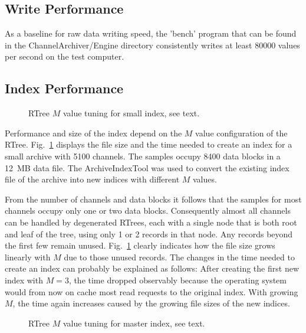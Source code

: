 \subsection{Write Performance}
As a baseline for raw data writing speed, the 'bench' program that can
be found in the ChannelArchiver/Engine directory consistently writes
at least 80000 values per second on the test computer.

\subsection{Index Performance}
\begin{figure}[htb]
\begin{center}
\end{center}
\caption{\label{fig:singleidxcompare}RTree $M$ value tuning for small index, see text.}
\end{figure}

Performance and size of the index depend on the $M$ value configuration of
the RTree. Fig.\ \ref{fig:singleidxcompare} displays the file size and
the time needed to create an index for a small archive with 5100
channels. The samples occupy 8400 data blocks in a 12~MB data file.
The ArchiveIndexTool was used to convert the existing index file of
the archive into new indices with different $M$ values.

From the number of channels and data blocks it follows that the
samples for most channels occupy only one or two data blocks.
Consequently almost all channels can be handled by degenerated RTrees, each
with a single node that is both root and leaf of the tree, using only
1 or 2 records in that node. Any records beyond the first few 
remain unused. Fig.\ \ref{fig:singleidxcompare} clearly indicates how
the file size grows linearly with $M$ due to those unused records.
The changes in the time needed to create an index can probably be
explained as follows: After creating the first new index with
$M=3$, the time dropped observably because the operating system would from now
on cache most read requests to the original index. With growing $M$,
the time again increases caused by the growing file sizes of the new indices.
 
\begin{figure}[htb]
\begin{center}
\end{center}
\caption{\label{fig:masteridxcompare}RTree $M$ value tuning for master
  index, see text.}
\end{figure}

